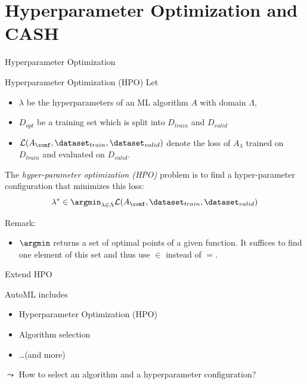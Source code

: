 \section{Hyperparameter Optimization and CASH}
\begin{frame}[c]{Hyperparameter Optimization}

\begin{block}{Hyperparameter Optimization (HPO)}
	Let 
	\begin{itemize}
		\item $\lambda$ be the hyperparameters of an ML algorithm $A$ with domain $\Lambda$,
		\item $D_{opt}$ be a training set which is split into $D_{train}$ and $D_{valid}$ 
		\item $\mathcal{L}(A_\conf, \dataset_{train}, \dataset_{valid})$ denote the loss of $A_\lambda$ trained on $D_{train}$ and evaluated on $D_{valid}$.
	\end{itemize}
	The \emph{hyper-parameter optimization (HPO)} problem is to find a hyper-parameter configuration that minimizes this loss:
	\begin{equation}
	\lambda^* \in \argmin_{\lambda \in \Lambda} \mathcal{L}(A_\conf, \dataset_{train}, \dataset_{valid}) \nonumber  
	\end{equation}
\end{block}

\pause
Remark: 

\begin{itemize}
  \item $\argmin$ returns a set of optimal points of a given function. It suffices to find one element of this set and thus use $\in$ instead of $=$.
\end{itemize}

\end{frame}
\begin{frame}[c]{Extend HPO}

AutoML includes

\begin{itemize}
  \item Hyperparameter Optimization (HPO)
  \item Algorithm selection 
  \item \ldots (and more)
\end{itemize}

\pause
\bigskip
$\leadsto$ How to select an algorithm and a hyperparameter configuration?


\end{frame}
